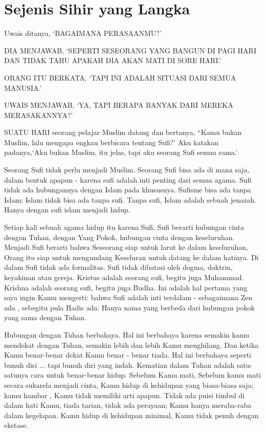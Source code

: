 \chapter{Sejenis Sihir yang Langka}
Uwais ditanya, ‘BAGAIMANA PERASAANMU?’

DIA MENJAWAB, ‘SEPERTI SESEORANG YANG BANGUN DI PAGI HARI DAN TIDAK TAHU APAKAH
DIA AKAN MATI DI SORE HARI.’

ORANG ITU BERKATA, ‘TAPI INI ADALAH SITUASI DARI SEMUA MANUSIA.’

UWAIS MENJAWAB, ‘YA, TAPI BERAPA BANYAK DARI MEREKA MERASAKANNYA?’


SUATU HARI seorang pelajar Muslim datang dan bertanya, “Kamu bukan Muslim, lalu mengapa engkau berbicara tentang Sufi?’ Aku katakan padanya,‘Aku bukan Muslim, itu jelas, tapi aku seorang Sufi semua sama.’

Seorang Sufi tidak perlu menjadi Muslim. Seorang Sufi bisa ada di mana saja, dalam bentuk apapun - karena sufi adalah
inti penting dari semua agama. Sufi tidak ada hubungannya dengan Islam pada khususnya. Sufisme bisa ada tanpa
Islam; Islam tidak bisa ada tanpa sufi. Tanpa sufi, Islam adalah sebuah jenazah. Hanya dengan sufi islam menjadi hidup.

Setiap kali sebuah agama hidup itu karena Sufi. Sufi berarti hubungan cinta dengan Tuhan, dengan
Yang Pokok, hubungan cinta dengan keseluruhan. Menjadi Sufi berarti bahwa Seseorang siap untuk larut ke dalam keseluruhan, 
Orang itu siap untuk mengundang Keseluran untuk datang ke dalam hatinya. Di dalam Sufi tidak ada formalitas. Sufi tidak dibatasi oleh
dogma, doktrin, keyakinan atau gereja. Kristus adalah seorang sufi, begitu juga Muhammad. Krishna adalah seorang sufi, begitu juga
Budha. Ini adalah hal pertama yang saya ingin Kamu mengerti: bahwa Sufi  adalah inti terdalam - sebagaimana
Zen ada , sebegitu pula Hadis ada. Hanya nama yang berbeda dari hubungan pokok yang sama dengan Tuhan.

Hubungan dengan Tuhan berbahaya. Hal ini berbahaya karena semakin kamu mendekat dengan Tuhan, semakin lebih
dan lebih Kamu menghilang. Dan ketika Kamu benar-benar dekat Kamu benar - benar tiada. Hal ini berbahaya
seperti bunuh diri ... tapi bunuh diri yang indah. Kematian dalam Tuhan adalah satu-satunya cara untuk benar-benar hidup.
Sebelum Kamu mati, Sebelum kamu mati secara sukarela menjadi cinta, Kamu hidup di kehidupan yang biasa-biasa saja; kamu
hambar , Kamu tidak memiliki arti apapun. Tidak ada puisi timbul di dalam hati Kamu, tiada tarian, tidak ada perayaan;
Kamu hanya meraba-raba dalam kegelapan. Kamu hidup di kehidupan minimal, Kamu tidak penuh dengan ekstase.

